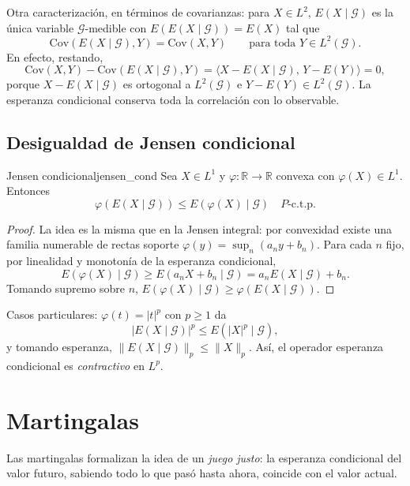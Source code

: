 \documentclass[11pt, a4paper]{article}
\begin{document}
\obs Otra caracterización, en términos de covarianzas: para $X \in L^2$,
$E(X \mid \mathcal{G})$ es la única variable $\mathcal{G}$-medible con $E(E(X \mid
\mathcal{G})) = E(X)$ tal que
$$ \mathrm{Cov}(E(X \mid \mathcal{G}), Y) = \mathrm{Cov}(X, Y) \qquad \text{para toda } Y \in
L^2(\mathcal{G}). $$
En efecto, restando,
$$ \mathrm{Cov}(X, Y) - \mathrm{Cov}(E(X \mid \mathcal{G}), Y) = \big\langle X - E(X \mid
\mathcal{G}), \, Y - E(Y) \big\rangle = 0, $$
porque $X - E(X \mid \mathcal{G})$ es ortogonal a $L^2(\mathcal{G})$ e $Y - E(Y) \in
L^2(\mathcal{G})$. La esperanza condicional conserva toda la correlación con lo observable.

\subsection{Desigualdad de Jensen condicional}

\begin{teorema}{Jensen condicional}{jensen_cond}
Sea $X \in L^1$ y $\varphi: \mathbb{R} \to \mathbb{R}$ convexa con $\varphi(X) \in L^1$. Entonces
$$ \varphi(E(X \mid \mathcal{G})) \le E(\varphi(X) \mid \mathcal{G}) \quad P\text{-c.t.p.} $$
\end{teorema}

\begin{proof}
La idea es la misma que en la Jensen integral: por convexidad existe una familia numerable de
rectas soporte $\varphi(y) = \sup_n (a_n y + b_n)$. Para cada $n$ fijo, por linealidad y monotonía
de la esperanza condicional,
$$ E(\varphi(X) \mid \mathcal{G}) \ge E(a_n X + b_n \mid \mathcal{G}) = a_n E(X \mid \mathcal{G})
+ b_n. $$
Tomando supremo sobre $n$, $E(\varphi(X) \mid \mathcal{G}) \ge \varphi(E(X \mid \mathcal{G}))$.
\end{proof}

\obs Casos particulares: $\varphi(t) = |t|^p$ con $p \ge 1$ da
$$ |E(X \mid \mathcal{G})|^p \le E(|X|^p \mid \mathcal{G}), $$
y tomando esperanza, $\|E(X \mid \mathcal{G})\|_p \le \|X\|_p$. Así, el operador esperanza
condicional es \emph{contractivo} en $L^p$.

\newpage

\section{Martingalas}

Las martingalas formalizan la idea de un \emph{juego justo}: la esperanza condicional del valor
futuro, sabiendo todo lo que pasó hasta ahora, coincide con el valor actual.
\end{document}
